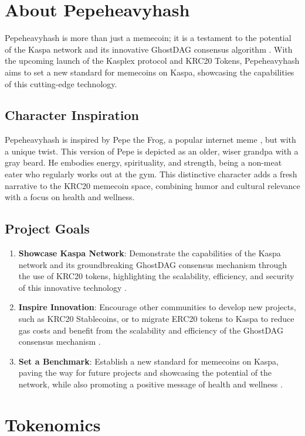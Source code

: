 \documentclass{article}
\begin{document}
\section{About Pepeheavyhash}
Pepeheavyhash is more than just a memecoin; it is a testament to the potential of the Kaspa network and its innovative GhostDAG consensus algorithm \citep{sompolinsky2020phantom}. With the upcoming launch of the Kasplex protocol and KRC20 Tokens, Pepeheavyhash aims to set a new standard for memecoins on Kaspa, showcasing the capabilities of this cutting-edge technology.

\subsection{Character Inspiration}
Pepeheavyhash is inspired by Pepe the Frog, a popular internet meme \citep{pepe2021}, but with a unique twist. This version of Pepe is depicted as an older, wiser grandpa with a gray beard. He embodies energy, spirituality, and strength, being a non-meat eater who regularly works out at the gym. This distinctive character adds a fresh narrative to the KRC20 memecoin space, combining humor and cultural relevance with a focus on health and wellness.

\subsection{Project Goals}
\begin{enumerate}
    \item \textbf{Showcase Kaspa Network}: Demonstrate the capabilities of the Kaspa network and its groundbreaking GhostDAG consensus mechanism through the use of KRC20 tokens, highlighting the scalability, efficiency, and security of this innovative technology \citep{sompolinsky2020phantom}.
    \item \textbf{Inspire Innovation}: Encourage other communities to develop new projects, such as KRC20 Stablecoins, or to migrate ERC20 tokens to Kaspa to reduce gas costs and benefit from the scalability and efficiency of the GhostDAG consensus mechanism \citep{kaspadev2024}.
    \item \textbf{Set a Benchmark}: Establish a new standard for memecoins on Kaspa, paving the way for future projects and showcasing the potential of the network, while also promoting a positive message of health and wellness \citep{cryptowellness2023}.
\end{enumerate}

\section{Tokenomics}
\end{document}
